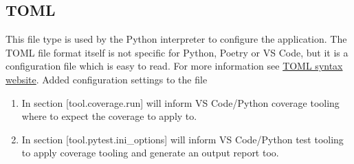 \subsection{TOML}
This file type is used by the Python interpreter to configure the application.
The TOML file format itself is not specific for Python, Poetry or VS Code, but it is a configuration file which is easy to read.
For more information see \href{https://coverage.readthedocs.io/en/latest/config.html#toml-syntax}{TOML syntax website}.
Added configuration settings to the  file

\begin{enumerate}
	\item In section [tool.coverage.run]  will inform VS Code/Python coverage tooling where to expect the coverage to apply to.
	\item In section [tool.pytest.ini\_options]  will inform VS Code/Python test tooling to apply coverage tooling and generate an output report too.
\end{enumerate}

